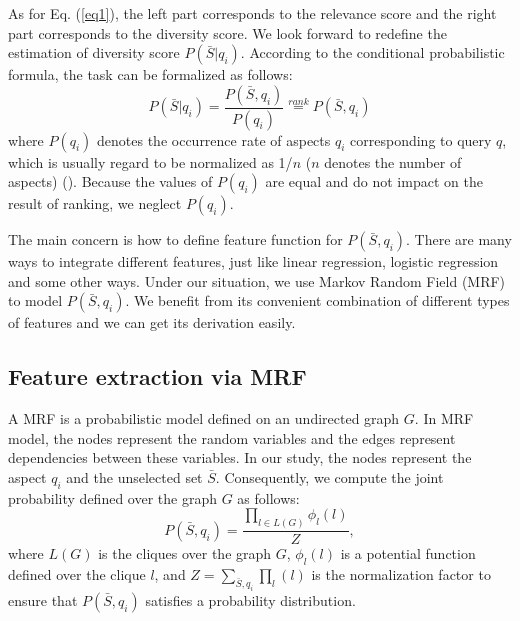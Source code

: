\documentclass[review]{elsarticle}
\newcommand\revised[1]{{\color{black} #1}}
\begin{document}
\revised{
As for Eq. (\ref{eq1}), the left part corresponds to the relevance score and the right part corresponds to the diversity score. We look forward to redefine the estimation of diversity score $P(\bar{S}|q_i)$. According to the conditional probabilistic formula, the task can be formalized as follows: }
\begin{equation}
	P(\bar{S}|q_i)=\frac{P(\bar{S},q_i)}{P(q_i)}\overset{rank}{=}P(\bar{S},q_i)
	\label{eq3}
\end{equation}
where $P(q_i)$ denotes the occurrence rate of aspects $q_i$ corresponding to query $q$, which is usually regard to be normalized as 1/$n$  ($n$ denotes the number of aspects) (\cite{santos2010exploiting}). Because the values of $P(q_i)$ are equal and do not impact on the result of ranking, we neglect $P(q_i)$.

The main concern is how to define feature function for $P(\bar{S}, q_i)$. There are many ways to integrate different features, just like linear regression, logistic regression and some other ways. Under our situation, we use Markov Random Field (MRF) to model $P(\bar{S}, q_i)$. We benefit from its convenient combination of different types of features and we can get its derivation easily.

\subsection{Feature extraction via MRF}
A MRF is a probabilistic model defined on an undirected graph $G$. In MRF model, the nodes represent the random variables and the edges represent dependencies between these variables. In our study, the nodes represent the aspect $q_i$ and the unselected set $\bar{S}$. Consequently, we compute the joint probability defined over the graph $G$ as follows:
\begin{equation}
	P(\bar{S},q_i)=\frac{\prod_{l\in L(G)}\phi_l(l)}{Z},
	\label{eq4}
\end{equation}
where $L(G)$ is the cliques over the graph $G$, $\phi_l(l)$ is a potential function defined over the clique $l$, and $Z=\sum_{\bar{S}, q_i}\prod_l(l)$ is the normalization factor to ensure that $P(\bar{S}, q_i)$ satisfies a probability distribution.
\end{document}
